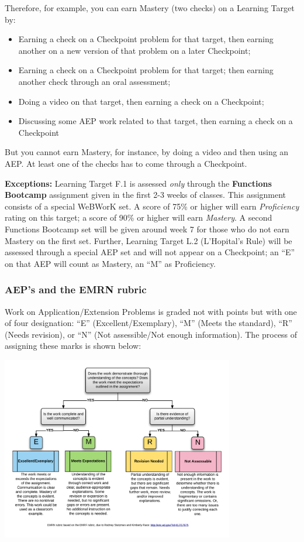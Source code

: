 \documentclass[]{article}
\providecommand{\tightlist}{%
  \setlength{\itemsep}{0pt}\setlength{\parskip}{0pt}}
\begin{document}
Therefore, for example, you can earn Mastery (two checks) on a Learning
Target by:

\begin{itemize}
\tightlist
\item
  Earning a check on a Checkpoint problem for that target, then earning
  another on a new version of that problem on a later Checkpoint;
\item
  Earning a check on a Checkpoint problem for that target; then earning
  another check through an oral assessment;
\item
  Doing a video on that target, then earning a check on a Checkpoint;
\item
  Discussing some AEP work related to that target, then earning a check
  on a Checkpoint
\end{itemize}

But you cannot earn Mastery, for instance, by doing a video and then
using an AEP. At least one of the checks has to come through a
Checkpoint.

\textbf{Exceptions:} Learning Target F.1 is assessed \emph{only} through
the \textbf{Functions Bootcamp} assignment given in the first 2-3 weeks
of classes. This assignment consists of a special WeBWorK set. A score
of 75\% or higher will earn \emph{Proficiency} rating on this target; a
score of 90\% or higher will earn \emph{Mastery}. A second Functions
Bootcamp set will be given around week 7 for those who do not earn
Mastery on the first set. Further, Learning Target L.2 (L'Hopital's
Rule) will be assessed through a special AEP set and will not appear on
a Checkpoint; an ``E'' on that AEP will count as Mastery, an ``M'' as
Proficiency.

\hypertarget{aeps-and-the-emrn-rubric}{%
\subsubsection{AEP's and the EMRN
rubric}\label{aeps-and-the-emrn-rubric}}

Work on Application/Extension Problems is graded not with points but
with one of four designation: ``E'' (Excellent/Exemplary), ``M'' (Meets
the standard), ``R'' (Needs revision), or ``N'' (Not assessible/Not
enough information). The process of assigning these marks is shown
below:

\begin{center}
    \includegraphics[width=4in]{EMRN.png}
\end{center}
\end{document}
